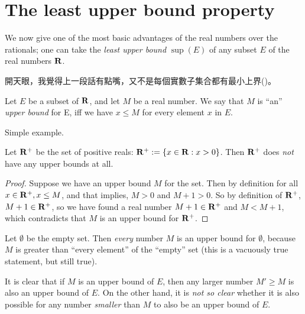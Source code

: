 \section{The least upper bound property} \label{sec 5.5}

We now give one of the most basic advantages of the real numbers over the rationals;
one can take the \emph{least upper bound} \(\sup(E)\) of any subset \(E\) of the real numbers \(\mathbf{R}\).

\begin{note}
開天眼，我覺得上一段話有點嘴，又不是每個實數子集合都有最小上界()。
\end{note}

\begin{definition}  \label{def 5.5.1}  Let \(E\) be a subset of \(\mathbf{R}\), and let \(M\) be a real number.
We say that \(M\) is ``an'' \emph{upper bound} for E, iff we have \(x \le M\) for every element \(x\) in \(E\).
\end{definition}

\begin{example}
Simple example.
\end{example}

\begin{example} \label{example 5.5.3}
Let \(\mathbf{R}^+\) be the set of positive reals:
\(\mathbf{R}^+ := \{x \in \mathbf{R} : x > 0\} \).
Then \(\mathbf{R}^+\) does \emph{not} have any upper bounds at all.
\end{example}

\begin{proof}
Suppose we have an upper bound \(M\) for the set.
Then by definition for all \(x \in \mathbf{R}^+, x \le M\), and that implies, \(M > 0\) and \(M + 1 > 0\).
So by definition of \(\mathbf{R}^+\), \(M + 1 \in \mathbf{R}^+\), so we have found a real number \(M + 1 \in \mathbf{R}^+\) and \(M < M + 1\), which contradicts that \(M\) is an upper bound for \(\mathbf{R}^+\).
\end{proof}

\begin{example} \label{example 5.5.4}
Let \(\emptyset\) be the empty set.
Then \emph{every} number \(M\) is an upper bound for \(\emptyset\), because \(M\) is greater than ``every element'' of the ``empty'' set
(this is a vacuously true statement, but still true).
\end{example}

\begin{note}
It is clear that if \(M\) is an upper bound of \(E\), then any larger number \(M' \geq M\) is also an upper bound of \(E\).
On the other hand, it is \emph{not so clear} whether it is also possible for any number \emph{smaller} than \(M\) to also be an upper bound of \(E\).
\end{note}

